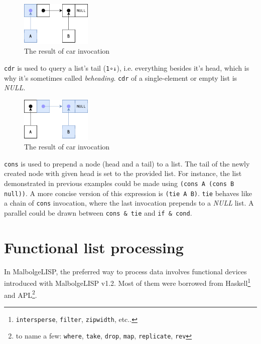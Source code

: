 \begin{figure}[H]
\centering
\includegraphics[width=0.3\textwidth]{figures/x1.png}
\caption{The result of car invocation}
\end{figure}

\par \verb|cdr| is used to query a list's tail (\verb|1∘↓|), i.e. everything besides it's head, which is why it's sometimes called \textit{beheading}. \verb|cdr| of a single-element or empty list is \textit{NULL}.

\begin{figure}[H]
\centering
\includegraphics[width=0.3\textwidth]{figures/x2.png}
\caption{The result of car invocation}
\end{figure}

\par \verb|cons| is used to prepend a node (head and a tail) to a list. The tail of the newly created node with given head is set to the provided list. For instance, the list demonstrated in previous examples could be made using \verb|(cons A (cons B null))|. A more concise version of this expression is \verb|(tie A B)|. \verb|tie| behaves like a chain of \verb|cons| invocation, where the last invocation prepends to a \textit{NULL} list. A parallel could be drawn between \verb|cons & tie| and \verb|if & cond|.

\section{Functional list processing}

\par In MalbolgeLISP, the preferred way to process data involves functional devices introduced with MalbolgeLISP v1.2. Most of them were borrowed from Haskell\footnote{\verb|intersperse|, \verb|filter|, \verb|zipwidth|, etc..} and APL\footnote{to name a few: \verb|where|, \verb|take|, \verb|drop|, \verb|map|, \verb|replicate|, \verb|rev|}.

